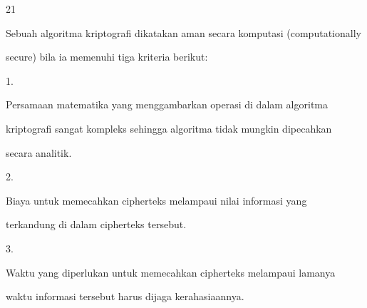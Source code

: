 \documentclass{article}
\begin{document}

21

Sebuah algoritma kriptografi dikatakan aman secara komputasi (computationally 

secure) bila ia memenuhi tiga kriteria berikut:

1.

Persamaan matematika yang menggambarkan operasi di dalam algoritma 

kriptografi sangat kompleks sehingga algoritma tidak mungkin dipecahkan 

secara analitik.

2.

Biaya untuk memecahkan cipherteks melampaui nilai informasi yang 

terkandung di dalam cipherteks tersebut.

3.

Waktu yang diperlukan untuk memecahkan cipherteks melampaui lamanya 

waktu informasi tersebut harus dijaga kerahasiaannya.
\end{document}
